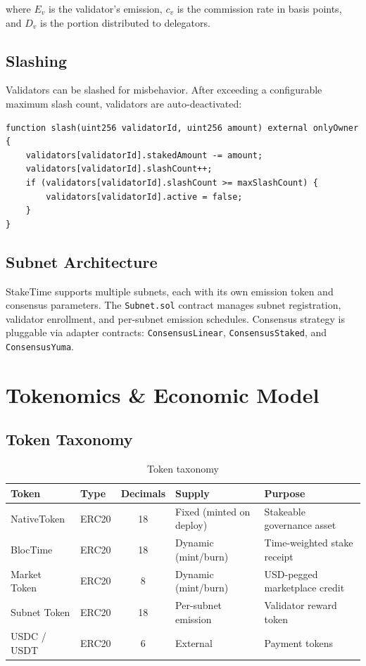 \documentclass[11pt,a4paper]{article}
\begin{document}
where $E_v$ is the validator's emission, $c_v$ is the commission rate in basis points, and $D_v$ is the portion distributed to delegators.

\subsection{Slashing}

Validators can be slashed for misbehavior. After exceeding a configurable maximum slash count, validators are auto-deactivated:

\begin{lstlisting}[style=solidity]
function slash(uint256 validatorId, uint256 amount) external onlyOwner {
    validators[validatorId].stakedAmount -= amount;
    validators[validatorId].slashCount++;
    if (validators[validatorId].slashCount >= maxSlashCount) {
        validators[validatorId].active = false;
    }
}
\end{lstlisting}

\subsection{Subnet Architecture}

StakeTime supports multiple subnets, each with its own emission token and consensus parameters. The \texttt{Subnet.sol} contract manages subnet registration, validator enrollment, and per-subnet emission schedules. Consensus strategy is pluggable via adapter contracts: \texttt{ConsensusLinear}, \texttt{ConsensusStaked}, and \texttt{ConsensusYuma}.

\section{Tokenomics \& Economic Model}
\label{sec:tokenomics}

\subsection{Token Taxonomy}

\begin{table}[H]
\centering
\begin{tabularx}{\textwidth}{llclX}
\toprule
\textbf{Token} & \textbf{Type} & \textbf{Decimals} & \textbf{Supply} & \textbf{Purpose} \\
\midrule
NativeToken & ERC20 & 18 & Fixed (minted on deploy) & Stakeable governance asset \\
BlocTime & ERC20 & 18 & Dynamic (mint/burn) & Time-weighted stake receipt \\
Market Token & ERC20 & 8 & Dynamic (mint/burn) & USD-pegged marketplace credit \\
Subnet Token & ERC20 & 18 & Per-subnet emission & Validator reward token \\
USDC / USDT & ERC20 & 6 & External & Payment tokens \\
\bottomrule
\end{tabularx}
\caption{Token taxonomy}
\end{table}
\end{document}
